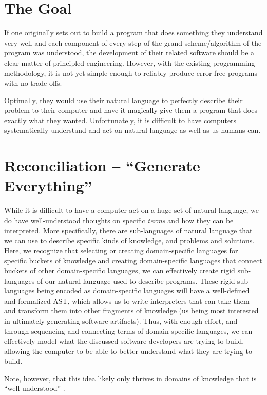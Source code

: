 \section{The Goal}\label{sec:idlgy:the_goal}

If one originally sets out to build a program that does something they
understand very well and each component of every step of the grand
scheme/algorithm of the program was understood, the development of their related
software should be a clear matter of principled engineering. However, with the
existing programming methodology, it is not yet simple enough to reliably
produce error-free programs with no trade-offs.

Optimally, they would use their natural language to perfectly describe their
problem to their computer and have it magically give them a program that does
exactly what they wanted. Unfortunately, it is difficult to have computers
systematically understand and act on natural language as well as us humans can.

\section{Reconciliation -- ``Generate Everything''}\label{sec:idlgy:generate_everything}

While it is difficult to have a computer act on a huge set of natural language,
we do have well-understood thoughts on specific \textit{terms} and how they can
be interpreted. More specifically, there are sub-languages of natural language
that we can use to describe specific kinds of knowledge, and problems and
solutions. Here, we recognize that selecting or creating domain-specific
languages for specific buckets of knowledge and creating domain-specific
languages that connect buckets of other domain-specific languages, we can
effectively create rigid sub-languages of our natural language used to describe
programs. These rigid sub-languages being encoded as domain-specific languages
will have a well-defined and formalized AST, which allows us
to write interpreters that can take them and transform them into other fragments
of knowledge (us being most interested in ultimately generating software
artifacts). Thus, with enough effort, and through sequencing and connecting
terms of domain-specific languages, we can effectively model what the discussed
software developers are trying to build, allowing the computer to be able to
better understand what they are trying to build.

Note, however, that this idea likely only thrives in domains of knowledge that
is ``well-understood'' \cite{well-understood}.

